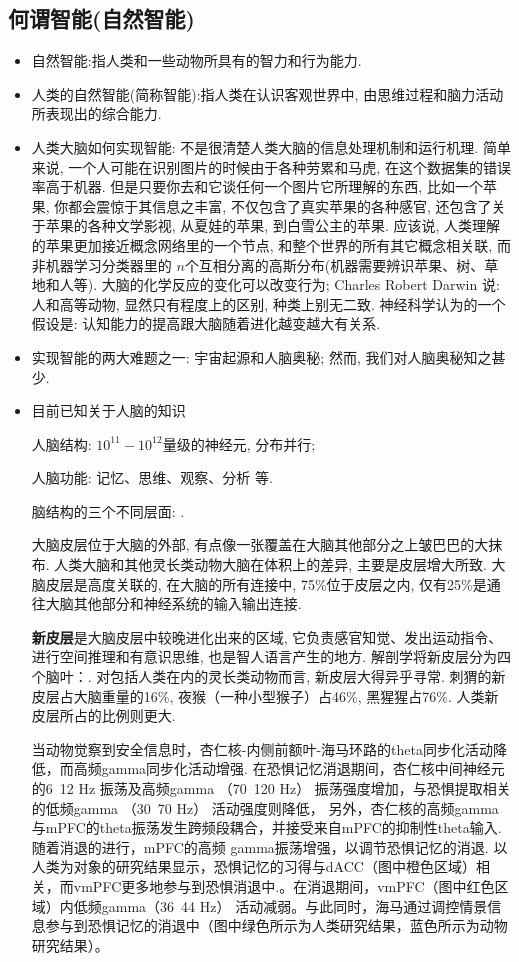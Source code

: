 \subsection{何谓智能(自然智能)}
\begin{itemize}
\item 自然智能:指人类和一些动物所具有的智力和行为能力.

\item 人类的自然智能(简称智能):指人类在认识客观世界中, 由思维过程和脑力活动所表现出的综合能力.

\item 人类大脑如何实现智能: 不是很清楚人类大脑的信息处理机制和运行机理. 简单来说, 一个人可能在识别图片的时候由于各种劳累和马虎, 在这个数据集的错误率高于机器.
但是只要你去和它谈任何一个图片它所理解的东西, 比如一个苹果, 你都会震惊于其信息之丰富, 不仅包含了真实苹果的各种感官, 还包含了关于苹果的各种文学影视, 从夏娃的苹果, 到白雪公主的苹果.
应该说, 人类理解的苹果更加接近概念网络里的一个节点, 和整个世界的所有其它概念相关联,  而非机器学习分类器里的 $n$个互相分离的高斯分布(机器需要辨识苹果、树、草地和人等).
       大脑的化学反应的变化可以改变行为; Charles Robert Darwin 说: 人和高等动物, 显然只有程度上的区别, 种类上别无二致. 神经科学认为的一个假设是: 认知能力的提高跟大脑随着进化越变越大有关系.
\item 实现智能的两大难题之一: 宇宙起源和人脑奥秘; 然而, 我们对人脑奥秘知之甚少.

\item 目前已知关于人脑的知识

      人脑结构: $10^{11}-10^{12}$量级的神经元, 分布并行;

      人脑功能: 记忆、思维、观察、分析 等.

      脑结构的三个不同层面: .

       大脑皮层位于大脑的外部, 有点像一张覆盖在大脑其他部分之上皱巴巴的大抹布.
      人类大脑和其他灵长类动物大脑在体积上的差异, 主要是皮层增大所致.
      大脑皮层是高度关联的, 在大脑的所有连接中, 75\%位于皮层之内, 仅有25\%是通往大脑其他部分和神经系统的输入输出连接.

      \textbf{新皮层}是大脑皮层中较晚进化出来的区域, 它负责感官知觉、发出运动指令、进行空间推理和有意识思维, 也是智人语言产生的地方.
      解剖学将新皮层分为四个脑叶：. 对包括人类在内的灵长类动物而言, 新皮层大得异乎寻常.
      刺猬的新皮层占大脑重量的16\%, 夜猴（一种小型猴子）占46\%, 黑猩猩占76\%. 人类新皮层所占的比例则更大.

      当动物觉察到安全信息时，杏仁核-内侧前额叶-海马环路的theta同步化活动降低，而高频gamma同步化活动增强. 在恐惧记忆消退期间，杏仁核中间神经元的6~12 Hz 振荡及高频gamma （70~120 Hz） 振荡强度增加，与恐惧提取相关的低频gamma （30~70 Hz） 活动强度则降低， 另外，杏仁核的高频gamma与mPFC的theta振荡发生跨频段耦合，并接受来自mPFC的抑制性theta输入. 随着消退的进行，mPFC的高频 gamma振荡增强，以调节恐惧记忆的消退. 以人类为对象的研究结果显示，恐惧记忆的习得与dACC（图中橙色区域）相关，而vmPFC更多地参与到恐惧消退中.。在消退期间，vmPFC（图中红色区域）内低频gamma（36~44 Hz） 活动减弱。与此同时，海马通过调控情景信息参与到恐惧记忆的消退中（图中绿色所示为人类研究结果，蓝色所示为动物研究结果）。


\end{itemize}
